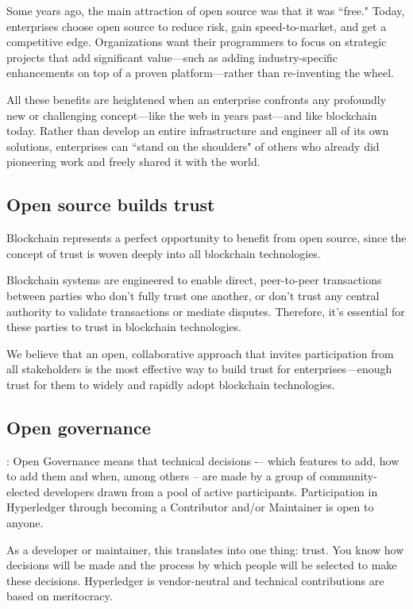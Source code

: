 Some years ago, the main attraction of open source was that it was ``free." 
Today, enterprises choose open source to reduce risk, gain speed-to-market, and get a competitive edge. 
Organizations want their programmers to focus on strategic projects that add significant value---such as adding industry-specific enhancements on top of a proven platform---rather than re-inventing the wheel. 

All these benefits are heightened when an enterprise confronts any profoundly new or challenging concept---like the web in years past---and like blockchain today. 
Rather than develop an entire infrastructure and engineer all of its own solutions, enterprises can ``stand on the shoulders" of others who already did pioneering work and freely shared it with the world. 

\subsection{Open source builds trust}
Blockchain represents a perfect opportunity to benefit from open source, since the concept of trust is woven deeply into all blockchain technologies. 

Blockchain systems are engineered to enable direct, peer-to-peer transactions between parties who don't fully trust one another, or don't trust any central authority to validate transactions or mediate disputes. 
Therefore, it's essential for these parties to trust in blockchain technologies. 

We believe that an open, collaborative approach that invites participation from all stakeholders is the most effective way to build trust for enterprises---enough trust for them to widely and rapidly adopt blockchain technologies. 

\subsection{Open governance}: 
Open Governance means that technical decisions -– which features to add, how to add them and when, among others – are made by a group of community-elected developers drawn from a pool of active participants. Participation in Hyperledger through becoming a Contributor and/or Maintainer is open to anyone.

As a developer or maintainer, this translates into one thing: trust. You know how decisions will be made and the process by which people will be selected to make these decisions. Hyperledger is vendor-neutral and technical contributions are based on meritocracy. 

